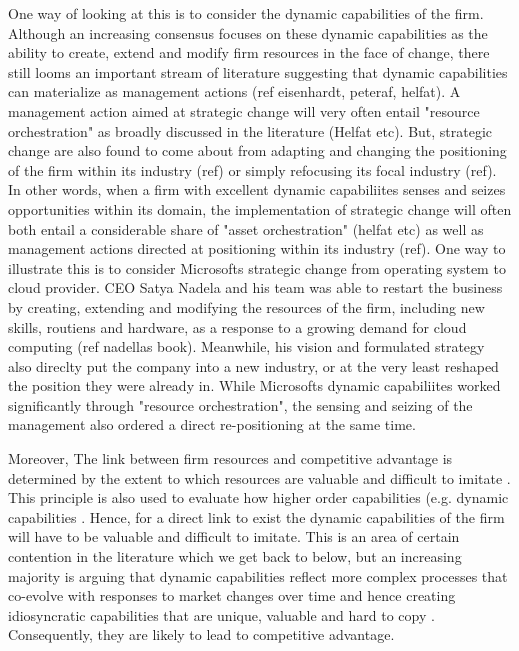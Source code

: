 \documentclass[review,fleqn]{elsarticle}\usepackage[]{graphicx}\usepackage[]{color}
\begin{document}
One way of looking at this is to consider the dynamic capabilities of the firm. Although
an increasing consensus focuses on these dynamic capabilities as the ability to create,
extend and modify firm resources in the face of change, there still looms an important
stream of literature suggesting that dynamic capabilities can materialize as management
actions (ref eisenhardt, peteraf, helfat). A management action aimed at strategic change
will very often entail "resource orchestration" as broadly discussed in the literature
(Helfat etc). But, strategic change are also found to come about from adapting and
changing the positioning of the firm within its industry (ref) or simply refocusing its
focal industry (ref). In other words, when a firm with excellent dynamic capabiliites
senses and seizes opportunities within its domain, the implementation of strategic change
will often both entail a considerable share of "asset orchestration" (helfat etc) as well
as management actions directed at positioning within its industry (ref). One way to
illustrate this is to consider Microsofts strategic change from operating system to cloud
provider. CEO Satya Nadela and his team was able to restart the business by creating,
extending and modifying the resources of the firm, including new skills, routiens and
hardware, as a response to a growing demand for cloud computing (ref nadellas
book). Meanwhile, his vision and formulated strategy also direclty put the company into a
new industry, or at the very least reshaped the position they were already in. While
Microsofts dynamic capabiliites worked significantly through "resource orchestration",
the sensing and seizing of the management also ordered a direct re-positioning at the same
time.  

Moreover, The link between firm resources and competitive advantage is determined by the
extent to which resources are valuable and difficult to imitate \citep{Barney1991a}. This
principle is also used to evaluate how higher order capabilities (e.g. dynamic
capabilities \citep{Winter2003,Collis1994,Teece2007}. Hence, for a direct link to exist
the dynamic capabilities of the firm will have to be valuable and difficult to
imitate. This is an area of certain contention in the literature \citep{Peteraf2013} which
we get back to below, but an increasing majority is arguing that dynamic capabilities
reflect more complex processes that co-evolve with responses to market changes over time
and hence creating idiosyncratic capabilities that are unique, valuable and hard to copy
\citep{Helfat2007,Arndt2018}. Consequently, they are likely to lead to competitive
advantage.
\end{document}
